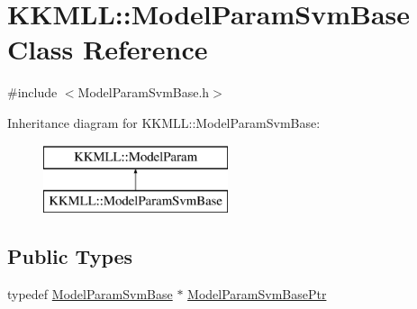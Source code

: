 \hypertarget{class_k_k_m_l_l_1_1_model_param_svm_base}{}\section{K\+K\+M\+LL\+:\+:Model\+Param\+Svm\+Base Class Reference}
\label{class_k_k_m_l_l_1_1_model_param_svm_base}


{\ttfamily \#include $<$Model\+Param\+Svm\+Base.\+h$>$}

Inheritance diagram for K\+K\+M\+LL\+:\+:Model\+Param\+Svm\+Base\+:\begin{figure}[H]
\begin{center}
\leavevmode
\includegraphics[height=2.000000cm]{class_k_k_m_l_l_1_1_model_param_svm_base}
\end{center}
\end{figure}
\subsection*{Public Types}
\begin{DoxyCompactItemize}
\item 
typedef \hyperlink{class_k_k_m_l_l_1_1_model_param_svm_base}{Model\+Param\+Svm\+Base} $\ast$ \hyperlink{class_k_k_m_l_l_1_1_model_param_svm_base_a5ad5361c21775170f41e908b5bf924d0}{Model\+Param\+Svm\+Base\+Ptr}
\end{DoxyCompactItemize}
